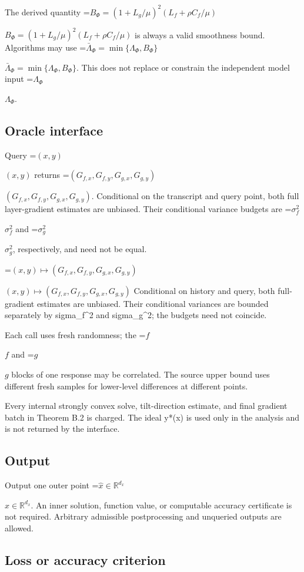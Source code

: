 \documentclass[10pt,a4paper]{article}
\newcommand{\AtlasMath}[1]{\par\begingroup\centering\setbox0=\hbox{$\displaystyle #1$}\ifdim\wd0>1.4\linewidth\typeout{ATLAS WIDE FORMULA: \the\wd0}\fi\ifdim\wd0>\linewidth\resizebox{\linewidth}{!}{\box0}\else\box0\fi\par\endgroup}
\newcommand{\AtlasInlineMath}[1]{\begingroup\setbox0=\hbox{$#1$}\ifdim\wd0>.4\linewidth\endgroup\AtlasMath{#1}\else\endgroup$#1$\fi}
\begin{document}
The derived quantity \AtlasInlineMath{B_\Phi=(1+L_g/\mu)^2(L_f+\rho C_f/\mu)} is always a valid smoothness bound. Algorithms may use \AtlasInlineMath{\bar\Lambda_\Phi=\min\{\Lambda_\Phi,B_\Phi\}}. This does not replace or constrain the independent model input \AtlasInlineMath{\Lambda_\Phi}.



\subsection{Oracle interface}


Query \AtlasInlineMath{(x,y)} returns \AtlasInlineMath{(G_{f,x},G_{f,y},G_{g,x},G_{g,y})}. Conditional on the transcript and query point, both full layer-gradient estimates are unbiased. Their conditional variance budgets are \AtlasInlineMath{\sigma_f^2} and \AtlasInlineMath{\sigma_g^2}, respectively, and need not be equal.



\AtlasInlineMath{(x,y)\longmapsto (G_{f,x},G_{f,y},G_{g,x},G_{g,y})} Conditional on history and query, both full-gradient estimates are unbiased. Their conditional variances are bounded separately by sigma\_f\textasciicircum{}2 and sigma\_g\textasciicircum{}2; the budgets need not coincide.



Each call uses fresh randomness; the \AtlasInlineMath{f} and \AtlasInlineMath{g} blocks of one response may be correlated. The source upper bound uses different fresh samples for lower-level differences at different points.



Every internal strongly convex solve, tilt-direction estimate, and final gradient batch in Theorem B.2 is charged. The ideal y*(x) is used only in the analysis and is not returned by the interface.



\subsection{Output}


Output one outer point \AtlasInlineMath{\widehat{x}\in\mathbb{R}^{d_x}}. An inner solution, function value, or computable accuracy certificate is not required. Arbitrary admissible postprocessing and unqueried outputs are allowed.



\subsection{Loss or accuracy criterion}
\end{document}
